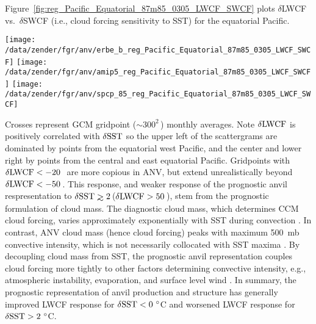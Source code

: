 \documentclass[twoside,agupp]{aguplus}
\begin{document}
Figure~\ref{fig:reg_Pacific_Equatorial_87m85_0305_LWCF_SWCF} plots 
$\delta$LWCF vs.\ $\delta$SWCF (i.e., cloud forcing sensitivity to
SST) for the equatorial Pacific.
\begin{figure*}
\begin{center}
\texttt{[image: /data/zender/fgr/anv/erbe\_b\_reg\_Pacific\_Equatorial\_87m85\_0305\_LWCF\_SWCF]}%
\texttt{[image: /data/zender/fgr/anv/amip5\_reg\_Pacific\_Equatorial\_87m85\_0305\_LWCF\_SWCF]}%
\texttt{[image: /data/zender/fgr/anv/spcp\_85\_reg\_Pacific\_Equatorial\_87m85\_0305\_LWCF\_SWCF]}%
\end{center}
\caption[$1987-1985$ differences in Spring quarter (March, April, and
May) monthly mean maritime LWCF and SWCF over the Equatorial Pacific
for ERBE, CCM, and ANV]{ 
$1987-1985$ differences in Spring quarter (March, April, and May) 
monthly mean maritime LWCF and SWCF (\wxmS) over the Equatorial
Pacific (10\,\dgr S--10\,\dgr N, 140\,\dgr E--90\,\dgr W) 
for (a) ERBE, (b) CCM, and (c) ANV.
Solid line is least-squares fit.
\label{fig:reg_Pacific_Equatorial_87m85_0305_LWCF_SWCF}}   
\end{figure*}
Crosses represent GCM gridpoint ($\sim 300^2$\,\kmS) monthly averages. 
Note $\delta \mbox{\textrm{LWCF}}$ is positively correlated with $\delta \mbox{\textrm{SST}}$ so
the upper left of the scattergrams are dominated by points from the
equatorial west Pacific, and the center and lower right by points from
the central and east equatorial Pacific.
Gridpoints with $\delta \mbox{\textrm{LWCF}} < -20$\,\wxmS\ are more copious in ANV,
but extend unrealistically beyond $\delta \mbox{\textrm{LWCF}} < -50$\,\wxmS.
This response, and weaker response of the prognostic anvil
respresentation to $\delta \SST \gtrsim 2$\,\dgrc ($\delta \mbox{\textrm{LWCF}} >
50$\,\wxmS), stem from the prognostic formulation of cloud mass. 
The diagnostic cloud mass, which determines CCM cloud forcing, varies
approximately exponentially with SST during convection \cite[]{KBB96}. 
In contrast, ANV cloud mass (hence cloud forcing) peaks with maximum
500~mb convective intensity, which is not necessarily collocated with
SST maxima \cite[]{Hac94}.
By decoupling cloud mass from SST, the prognostic anvil representation
couples cloud forcing more tightly to other factors determining
convective intensity, e.g., atmospheric instability, evaporation, and
surface level wind \cite[]{FDR90}. 
In summary, the prognostic representation of anvil production and
structure has generally improved LWCF response for $\delta \mbox{\textrm{SST}} < 0\
^{\circ}$C and worsened LWCF response for $\delta \mbox{\textrm{SST}} > 2\
^{\circ}$C. 
\end{document}
